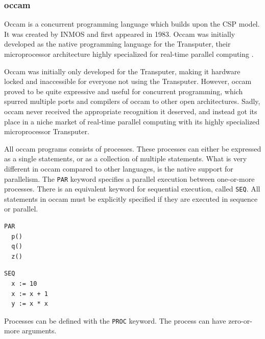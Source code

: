 \subsubsection{occam}
\label{sssec:occam}

Occam is a concurrent programming language which builds upon the CSP model. It was created by INMOS \citep{occam} and first appeared in 1983. Occam was initially developed as the native programming language for the Transputer, their microprocessor architecture highly specialized for real-time parallel computing \citep{transputer}. 

Occam was initially only developed for the Transputer, making it hardware locked and inaccessible for everyone not using the Transputer. However, occam proved to be quite expressive and useful for concurrent programming, which spurred multiple ports and compilers of occam to other open architectures. Sadly, occam never received the appropriate recognition it deserved, and instead got its place in a niche market of real\hyp{}time parallel computing with its highly specialized microprocessor Transputer. 

All occam programs consists of processes. These processes can either be expressed as a single statements, or as a collection of multiple statements. What is very different in occam compared to other languages, is the native support for parallelism. The \texttt{PAR} keyword specifies a parallel execution between one\hyp{}or\hyp{}more processes. There is an equivalent keyword for sequential execution, called \texttt{SEQ}. All statements in occam must be explicitly specified if they are executed in sequence or parallel. 

\noindent\begin{minipage}{0.45\textwidth}
\begin{lstlisting}[style={CustomC},frame={},numbers={none},xleftmargin={4em}]
PAR
  p()
  q()
  z()
\end{lstlisting}
\end{minipage}
\begin{minipage}{0.45\textwidth}
\begin{lstlisting}[style={CustomC},frame={},numbers={none},xleftmargin={4em}]
SEQ
  x := 10
  x := x + 1
  y := x * x
\end{lstlisting}
\end{minipage}

Processes can be defined with the \texttt{PROC} keyword. The process can have zero\hyp{}or\hyp{}more arguments. 

